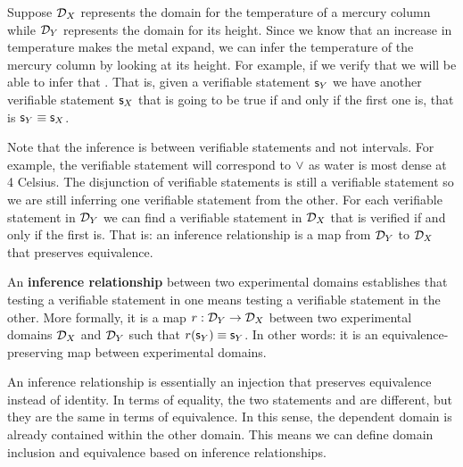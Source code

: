 \documentclass[11pt,letterpaper,fleqn]{memoir} %
\begin{document}
Suppose $\mathcal{D}_X$ represents the domain for the temperature of a mercury column while $\mathcal{D}_Y$ represents the domain for its height. Since we know that an increase in temperature makes the metal expand, we can infer the temperature of the mercury column by looking at its height. For example, if we verify that  we will be able to infer that . That is, given a verifiable statement $\mathsf{s}_Y$ we have another verifiable statement $\mathsf{s}_X$ that is going to be true if and only if the first one is, that is $\mathsf{s}_Y\equiv\mathsf{s}_X$.

Note that the inference is between verifiable statements and not intervals. For example, the verifiable statement  will correspond to $\vee$ as water is most dense at 4 Celsius. The disjunction of verifiable statements is still a verifiable statement so we are still inferring one verifiable statement from the other. For each verifiable statement in $\mathcal{D}_Y$ we can find a verifiable statement in $\mathcal{D}_X$ that is verified if and only if the first is. That is: an inference relationship is a map from $\mathcal{D}_Y$ to $\mathcal{D}_X$ that preserves equivalence.

\begin{mathSection}
	\begin{defn}
		An \textbf{inference relationship} between two experimental domains establishes that testing a verifiable statement in one means testing a verifiable statement in the other. More formally, it is a map $r: \mathcal{D}_Y \to \mathcal{D}_X$ between two experimental domains $\mathcal{D}_X$ and $\mathcal{D}_Y$ such that $r(\mathsf{s}_Y) \equiv \mathsf{s}_Y$. In other words: it is an equivalence-preserving map between experimental domains.
	\end{defn}
\end{mathSection}

An inference relationship is essentially an injection that preserves equivalence instead of identity. In terms of equality, the two statements  and  are different, but they are the same in terms of equivalence. In this sense, the dependent domain is already contained within the other domain. This means we can define domain inclusion and equivalence based on inference relationships.
\end{document}
